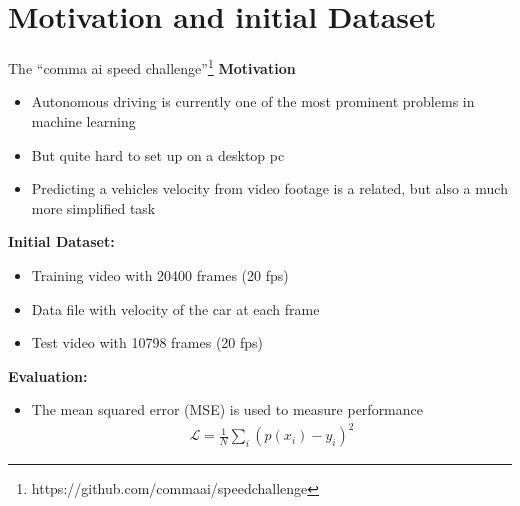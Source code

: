 \section{Motivation and initial Dataset}


\begin{frame}{The \enquote{comma ai speed challenge}\footnote{https://github.com/commaai/speedchallenge}}
	\textbf{Motivation}
	\begin{itemize}
		\item Autonomous driving is currently one of the most prominent problems in machine learning
		\item But quite hard to set up on a desktop pc
		\item Predicting a vehicles velocity from video footage is a related, but also a much more simplified task
	\end{itemize}
	\pause
	\textbf{Initial Dataset:}
	\begin{itemize}
		\item Training video with 20400 frames (20 fps)
		\item Data file with velocity of the car at each frame
		\item Test video with 10798 frames (20 fps)
	\end{itemize}
	\pause
	\textbf{Evaluation:}
	\begin{itemize}
		\item The mean squared error (MSE) is used to measure performance
		\begin{align*}
			\mathcal{L} = \frac{1}{N}\sum_i (p(x_i) - y_i)^2
		\end{align*}
	\end{itemize}
\end{frame}

